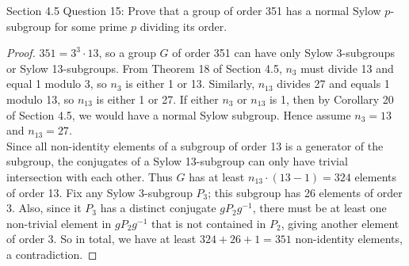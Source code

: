 Section 4.5 Question 15: Prove that a group of order 351 has a normal Sylow
$p$-subgroup for some prime $p$ dividing its order.

\begin{proof}
  $351=3^3\cdot13$, so a group $G$ of order 351 can have only Sylow
  3-subgroups or Sylow 13-subgroups. From Theorem 18 of Section 4.5, $n_3$
  must divide 13 and equal 1 modulo 3, so $n_3$ is either 1 or 13.
  Similarly, $n_{13}$ divides 27 and equals 1 modulo 13, so $n_{13}$ is
  either 1 or 27. If either $n_3$ or $n_{13}$ is 1, then by Corollary 20 of
  Section 4.5, we would have a normal Sylow subgroup. Hence assume $n_3=13$
  and $n_{13}=27$. \\

  Since all non-identity elements of a subgroup of order 13 is a generator of
  the subgroup, the conjugates of a Sylow 13-subgroup can only have trivial
  intersection with each other. Thus $G$ has at least
  $n_{13}\cdot(13-1)=324$ elements of order 13. Fix any Sylow 3-subgroup
  $P_3$; this subgroup has 26 elements of order 3. Also, since it
  $P_3$ has a distinct conjugate $gP_2g^{-1}$, there must be at least one
  non-trivial element in $gP_2g^{-1}$ that is not contained in $P_2$,
  giving another element of order 3. So in total, we have at least
  $324+26+1=351$ non-identity elements, a contradiction.
\end{proof}
